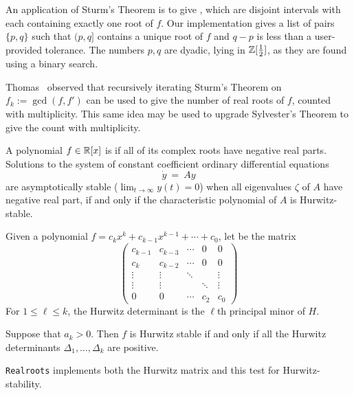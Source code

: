 An application of Sturm's Theorem is to give , which are disjoint intervals with each containing exactly one root
of $f$. 
Our implementation gives a list of pairs $\{p,q\}$ such that $(p,q]$ contains a unique root of $f$ and $q-p$ is less than a
user-provided tolerance.
The numbers $p,q$ are dyadic, lying in $\mathbb{Z}[\frac{1}{2}]$, as they are found using a binary search.
%
\begin{leftbar}

\end{leftbar}
%
Thomas~\cite{Thomas} observed that recursively iterating Sturm's Theorem on $f_k:=\gcd(f,f')$ can be used to give the number of real roots of
$f$, counted with multiplicity.
This same idea may be used to upgrade Sylvester's Theorem to give the count with multiplicity.
%
\begin{leftbar}

\end{leftbar}
%

A polynomial $f\in\mathbb{R}[x]$ is  if all of its complex roots have negative real parts.
Solutions to the system of constant coefficient ordinary differential equations 
%
 \[
  \dot{y}\ =\ Ay
 \]
%
are asymptotically stable ($\lim_{t\to\infty}y(t)=0$) when all eigenvalues $\zeta$ of $A$ have negative real part,
if and only if the characteristic polynomial of $A$ is Hurwitz-stable.
 
Given a polynomial $f=c_kx^k+c_{k-1}x^{k-1}+\dotsb+c_0$,  let  be the matrix
\[
\left(\begin{matrix}
  c_{k-1} & c_{k-3} & \dotsb & 0  & 0 \\
  c_k    & c_{k-2} &  \dotsb& 0 & 0 \\
  \vdots & \vdots & \ddots&    &\vdots\\
  \vdots & \vdots & & \ddots&\vdots\\
    0    &    0   & \dotsb&c_2 & c_0
\end{matrix}\right)
\]
For $1\leq \ell\leq k$, the Hurwitz determinant  is the $\ell$th principal minor of $H$.


\begin{theorem}
  Suppose that $a_k>0$.
  Then $f$ is Hurwitz stable if and only if all the Hurwitz determinants $\Delta_{1},\dots,\Delta_{k}$ are positive.
\end{theorem}

{\tt Realroots} implements both the Hurwitz matrix and this test for Hurwitz-stability.
%
\begin{leftbar}

\end{leftbar}
%
